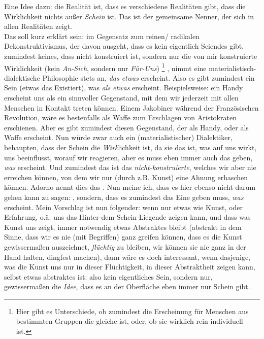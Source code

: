 \documentclass[12pt, a4paper, openany]{report}
\begin{document}
Eine Idee dazu: die Realität ist, dass es verschiedene Realitäten gibt, dass die Wirklichkeit nichts außer \emph{Schein} ist.
Das ist der gemeinsame Nenner, der sich in allen Realitäten zeigt.\\
Das soll kurz erklärt sein: 
im Gegensatz zum reinen/ radikalen Dekonstruktivismus, der davon ausgeht, dass es kein eigentlich Seiendes gibt, zumindest keines, dass nicht konstruiert ist, sondern nur die von mir konstruierte Wirklichkeit (kein \emph{An-Sich}, sondern nur \emph{Für-Uns})%
\footnote{Hier gibt es Unterschiede, ob zumindest die Erscheinung für Menschen aus bestimmten Gruppen die gleiche ist, oder, ob sie wirklich rein individuell ist.}%
, nimmt eine materialistisch-dialektische Philosophie stets an, \emph{das etwas} erscheint.
Also es gibt zumindest ein Sein (etwas das Existiert), was \emph{als etwas} erscheint.
Beispielsweise: 
ein Handy erscheint uns als ein sinnvoller Gegenstand, mit dem wir jederzeit mit allen Menschen in Kontakt treten können.
Einem Jakobiner während der Französischen Revolution, wäre es bestenfalls als Waffe zum Erschlagen von Aristokraten erschienen.
Aber es gibt zumindest diesen Gegenstand, der als Handy, oder als Waffe erscheint.
Nun würde zwar auch ein (materialistischer) Dialektiker, behaupten, dass der Schein die \emph{Wirk}lichkeit ist, da sie das ist, was auf uns wirkt, uns beeinflusst, worauf wir reagieren, aber es muss eben immer auch das geben, \emph{was} erscheint. 
Und zumindest das ist das \emph{nicht-konstruierte}, welches wir aber nie erreichen können, von dem wir nur (durch z.B. Kunst) eine Ahnung erhaschen können.
Adorno nennt dies das .
Nun meine ich, dass es hier ebenso nicht darum gehen kann zu sagen: 
, sondern, dass es zumindest das Eine geben muss, \emph{was} erscheint. 
Mein Vorschlag ist nun folgender: wenn nur etwas wie Kunst, oder Erfahrung, o.ä. uns das Hinter-dem-Schein-Liegende zeigen kann, und dass was Kunst uns zeigt, immer notwendig etwas Abstraktes bleibt (abstrakt in dem Sinne, dass wir es nie (mit Begriffen) ganz greifen können, dass es die Kunst gewissermaßen auszeichnet, \emph{flüchtig} zu bleiben, wir können sie nie ganz in der Hand halten, dingfest machen), dann wäre es doch interessant, wenn dasjenige, was die Kunst uns nur in dieser Flüchtigkeit, in dieser Abstraktheit zeigen kann, selbst etwas abstraktes ist: also kein eigentliches Sein, sondern nur, gewissermaßen die \emph{Idee}, dass es an der Oberfläche eben immer nur Schein gibt. 
\end{document}
